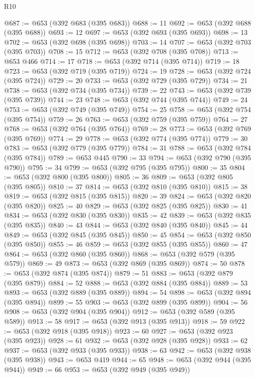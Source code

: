 \begin{lexlean}{R10}
\begin{coremodule}
@687 := @653 (@392 @683 (@395 @683))
@688 := 11
@692 := @653 (@392 @688 (@395 @688))
@693 := 12
@697 := @653 (@392 @693 (@395 @693))
@698 := 13
@702 := @653 (@392 @698 (@395 @698))
@703 := 14
@707 := @653 (@392 @703 (@395 @703))
@708 := 15
@712 := @653 (@392 @708 (@395 @708))
@713 := @653 @466
@714 := 17
@718 := @653 (@392 @714 (@395 @714))
@719 := 18
@723 := @653 (@392 @719 (@395 @719))
@724 := 19
@728 := @653 (@392 @724 (@395 @724))
@729 := 20
@733 := @653 (@392 @729 (@395 @729))
@734 := 21
@738 := @653 (@392 @734 (@395 @734))
@739 := 22
@743 := @653 (@392 @739 (@395 @739))
@744 := 23
@748 := @653 (@392 @744 (@395 @744))
@749 := 24
@753 := @653 (@392 @749 (@395 @749))
@754 := 25
@758 := @653 (@392 @754 (@395 @754))
@759 := 26
@763 := @653 (@392 @759 (@395 @759))
@764 := 27
@768 := @653 (@392 @764 (@395 @764))
@769 := 28
@773 := @653 (@392 @769 (@395 @769))
@774 := 29
@778 := @653 (@392 @774 (@395 @774))
@779 := 30
@783 := @653 (@392 @779 (@395 @779))
@784 := 31
@788 := @653 (@392 @784 (@395 @784))
@789 := @653 @445
@790 := 33
@794 := @653 (@392 @790 (@395 @790))
@795 := 34
@799 := @653 (@392 @795 (@395 @795))
@800 := 35
@804 := @653 (@392 @800 (@395 @800))
@805 := 36
@809 := @653 (@392 @805 (@395 @805))
@810 := 37
@814 := @653 (@392 @810 (@395 @810))
@815 := 38
@819 := @653 (@392 @815 (@395 @815))
@820 := 39
@824 := @653 (@392 @820 (@395 @820))
@825 := 40
@829 := @653 (@392 @825 (@395 @825))
@830 := 41
@834 := @653 (@392 @830 (@395 @830))
@835 := 42
@839 := @653 (@392 @835 (@395 @835))
@840 := 43
@844 := @653 (@392 @840 (@395 @840))
@845 := 44
@849 := @653 (@392 @845 (@395 @845))
@850 := 45
@854 := @653 (@392 @850 (@395 @850))
@855 := 46
@859 := @653 (@392 @855 (@395 @855))
@860 := 47
@864 := @653 (@392 @860 (@395 @860))
@868 := @653 (@392 @579 (@395 @579))
@869 := 49
@873 := @653 (@392 @869 (@395 @869))
@874 := 50
@878 := @653 (@392 @874 (@395 @874))
@879 := 51
@883 := @653 (@392 @879 (@395 @879))
@884 := 52
@888 := @653 (@392 @884 (@395 @884))
@889 := 53
@893 := @653 (@392 @889 (@395 @889))
@894 := 54
@898 := @653 (@392 @894 (@395 @894))
@899 := 55
@903 := @653 (@392 @899 (@395 @899))
@904 := 56
@908 := @653 (@392 @904 (@395 @904))
@912 := @653 (@392 @589 (@395 @589))
@913 := 58
@917 := @653 (@392 @913 (@395 @913))
@918 := 59
@922 := @653 (@392 @918 (@395 @918))
@923 := 60
@927 := @653 (@392 @923 (@395 @923))
@928 := 61
@932 := @653 (@392 @928 (@395 @928))
@933 := 62
@937 := @653 (@392 @933 (@395 @933))
@938 := 63
@942 := @653 (@392 @938 (@395 @938))
@943 := @653 @419
@944 := 65
@948 := @653 (@392 @944 (@395 @944))
@949 := 66
@953 := @653 (@392 @949 (@395 @949))

\end{coremodule}
\end{lexlean}

